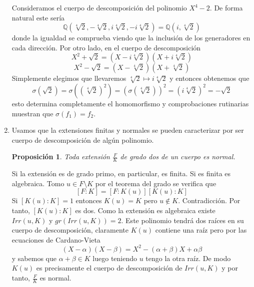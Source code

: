 \documentclass{article}
\theoremstyle{theorem-style}  %
\newtheorem{proposition}[theorem]{Proposición}
\theoremstyle{definition-style}
\theoremstyle{example-style}
\begin{document}
\begin{enumerate}
Consideramos el cuerpo de descomposición del polinomio $X^4-2$. De forma natural este sería $$\mathbb{Q}(\sqrt[4]{2},-\sqrt[4]{2},i\sqrt[4]{2},-i\sqrt[4]{2}) = \mathbb{Q}(i,\sqrt[4]{2})$$ donde la igualdad se comprueba viendo que la inclusión de los generadores en cada dirección. Por otro lado, en el cuerpo de descomposición $$X^2 + \sqrt{2} = (X - i \sqrt[4]{2})(X + i \sqrt[4]{2})$$ $$X^2 - \sqrt{2} = (X - \sqrt[4]{2})(X + \sqrt[4]{2})$$ Simplemente elegimos que llevaremos $\sqrt[4]{2} \mapsto i \sqrt[4]{2}$ y entonces obtenemos que $$\sigma(\sqrt{2}) = \sigma((\sqrt[4]{2})^2) = (\sigma(\sqrt[4]{2}))^2 = (i \sqrt[4]{2})^2 = - \sqrt{2}$$ esto determina completamente el homomorfismo y comprobaciones rutinarias muestran que $\sigma(f_1) = f_2$. 

\item Usamos que la extensiones finitas y normales se pueden caracterizar por ser cuerpo de descomposición de algún polinomio. 

\begin{proposition}
Toda extensión $\frac{F}{K}$ de grado dos de un cuerpo es normal.
\end{proposition}
 

Si la extensión es de grado primo, en particular, es finita. Si es finita es algebraica. Tomo $u \in F \setminus K$ por el teorema del grado se verifica que $$[F:K] = [F:K(u)][K(u):K]$$ Si $[K(u):K] = 1$ entonces $K(u) = K$ pero $u \notin K$. Contradicción. Por tanto, $[K(u):K]$ es dos. Como la extensión es algebraica existe $Irr(u,K)$ y $gr(Irr(u,K)) = 2$. Este polinomio tendrá dos raíces en su cuerpo de descomposición, claramente $K(u)$ contiene una raíz pero por las ecuaciones de Cardano-Vieta $$(X - \alpha)(X - \beta) = X^2 - (\alpha+\beta)X + \alpha\beta$$ y sabemos que $\alpha + \beta \in K$ luego teniendo $u$ tengo la otra raíz. De modo $K(u)$ es precisamente el cuerpo de descomposición de $Irr(u,K)$ y por tanto, $\frac{F}{K}$ es normal. 


\end{enumerate}
\end{document}
